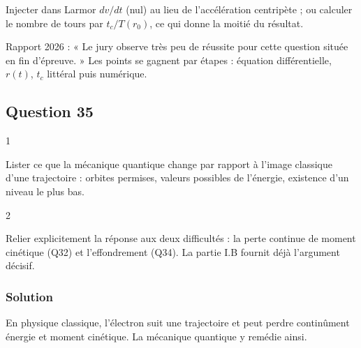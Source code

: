 \documentclass[11pt,a4paper]{article}
\begin{document}
\begin{piege}

Injecter dans Larmor \(dv/dt\) (nul) au lieu de l'accélération centripète ; ou calculer le nombre de tours par \(t_c/T(r_0)\), ce qui donne la moitié du résultat.

\end{piege}

\begin{jury}

Rapport 2026 : « Le jury observe très peu de réussite pour cette question située en fin d'épreuve. » Les points se gagnent par étapes : équation différentielle, \(r(t)\), \(t_c\) littéral puis numérique.

\end{jury}

\hypertarget{question-35}{%
\subsection{Question 35}\label{question-35}}

\begin{indication}{1}

Lister ce que la mécanique quantique change par rapport à l'image classique d'une trajectoire : orbites permises, valeurs possibles de l'énergie, existence d'un niveau le plus bas.

\end{indication}

\begin{indication}{2}

Relier explicitement la réponse aux deux difficultés : la perte continue de moment cinétique (Q32) et l'effondrement (Q34). La partie I.B fournit déjà l'argument décisif.

\end{indication}

\hypertarget{solution-34}{%
\subsubsection{Solution}\label{solution-34}}

En physique classique, l'électron suit une trajectoire et peut perdre continûment énergie et moment cinétique. La mécanique quantique y remédie ainsi.
\end{document}
